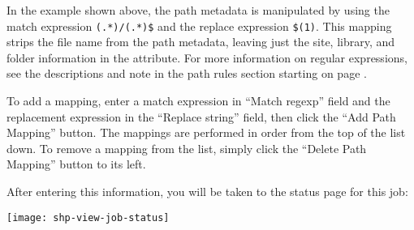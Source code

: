 \begin{itemize}
In the example shown above, the path metadata is manipulated by using
the match expression \texttt{(.*)/(.*)\$} and the replace expression
\texttt{\$(1)}. This mapping strips the file name from the path
metadata, leaving just the site, library, and folder information in
the attribute. For more information on regular expressions, see the
descriptions and note in the path rules section starting on page
\pageref{pathrules}.

To add a mapping, enter a match expression in ``Match regexp'' field
and the replacement expression in the ``Replace string'' field, then
click the ``Add Path Mapping'' button. The mappings are performed in
order from the top of the list down. To remove a mapping from the
list, simply click the ``Delete Path Mapping'' button to its left.




\end{itemize}

After entering this information, you will be taken to the status page
for this job:

\texttt{[image: shp-view-job-status]}
